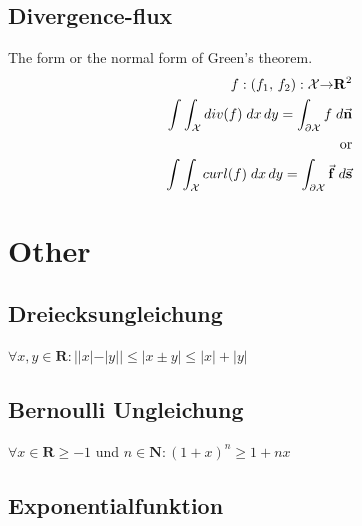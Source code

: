 \documentclass[8pt]{extarticle}
\newcommand{\R}{{\mathbb R}}
\newcommand{\X}{{\mathcal X}}
\newcommand{\ra}{{\rightarrow}}
\def\R{\mathbf{R}}
\begin{document}
\begin{multicols*}{3}
  \subsection{Divergence-flux}
  The form or the normal form of Green's theorem.
  \begin{align*}
    f:(f_1, \, f_2): \X \ra \R^2                                                               \\
    \int \int_\X div(f) \; dx \, dy = \int_{\partial \X} f \; d \vectorarrow{n}                \\
    \text{or}                                                                                  \\
    \int \int_\X curl(f) \; dx \, dy = \int_{\partial \X} \vectorarrow{f} \; d \vectorarrow{s} \\
  \end{align*}
\section{Other}


\subsection{Dreiecksungleichung}

\begin{center}
  $\forall x, y \in \mathbf{R} : ||x| - |y|| \leq |x \pm y| \leq |x| + |y|$
\end{center}

\subsection{Bernoulli Ungleichung}

\begin{center}
  $ \forall x \in \mathbf{R} \geq -1$ und $n \in \mathbf{N}: (1 + x)^{n} \geq 1 + nx$
\end{center}

\subsection{Exponentialfunktion}


\end{multicols*}
\end{document}
